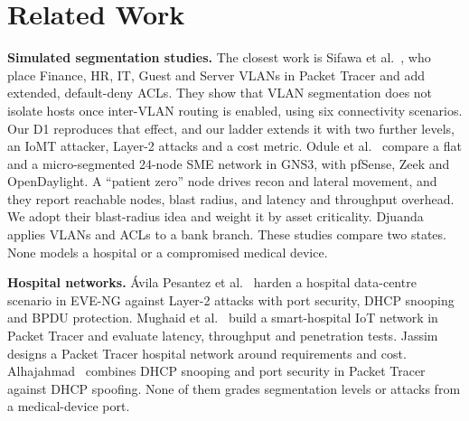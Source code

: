 \section{Related Work}
\label{sec:related}

\textbf{Simulated segmentation studies.}
The closest work is Sifawa et al.~\cite{Sifawa2026ImplementationEvaluation}, who place Finance, HR, IT, Guest and Server VLANs in Packet Tracer and add extended, default-deny ACLs. They show that VLAN segmentation does not isolate hosts once inter-VLAN routing is enabled, using six connectivity scenarios. Our D1 reproduces that effect, and our ladder extends it with two further levels, an IoMT attacker, Layer-2 attacks and a cost metric. Odule et al.~\cite{Odule2026SimulationValidation} compare a flat and a micro-segmented 24-node SME network in GNS3, with pfSense, Zeek and OpenDaylight. A ``patient zero'' node drives recon and lateral movement, and they report reachable nodes, blast radius, and latency and throughput overhead. We adopt their blast-radius idea and weight it by asset criticality. Djuanda~\cite{Djuanda2024NetworkSecurity} applies VLANs and ACLs to a bank branch. These studies compare two states. None models a hospital or a compromised medical device.

\textbf{Hospital networks.}
\'{A}vila Pesantez et al.~\cite{AvilaPesantez2022HospitalSwitchPolicies} harden a hospital data-centre scenario in EVE-NG against Layer-2 attacks with port security, DHCP snooping and BPDU protection. Mughaid et al.~\cite{Mughaid2026SecureAdaptive} build a smart-hospital IoT network in Packet Tracer and evaluate latency, throughput and penetration tests. Jassim~\cite{Jassim2024SmartHospital} designs a Packet Tracer hospital network around requirements and cost. Alhajahmad~\cite{Alhajahmad2025ImprovingSwitch} combines DHCP snooping and port security in Packet Tracer against DHCP spoofing. None of them grades segmentation levels or attacks from a medical-device port.

